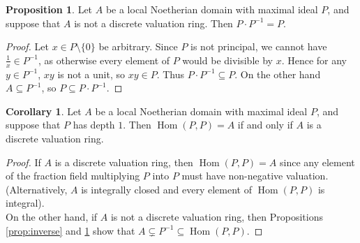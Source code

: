\documentclass{amsart}
\theoremstyle{definition}
\newtheorem{proposition}[theorem]{Proposition}
\newtheorem{corollary}[theorem]{Corollary}
\DeclareMathOperator{\Hom}{Hom}
\begin{document}
\begin{proposition}\label{prop:ptimespinverse}
Let $A$ be a local Noetherian domain with maximal ideal $P$, and suppose that $A$ is not a discrete valuation ring.  Then $P\cdot P^{-1}  = P$.
\end{proposition}
\begin{proof}
Let $x\in P\setminus\{0\}$ be arbitrary.  Since $P$ is not principal, we cannot have $\frac{1}{x} \in P^{-1}$, as otherwise every element of $P$ would be divisible by $x$.  Hence for any $y\in P^{-1}$, $xy$ is not a unit, so $xy\in P$.  Thus $P\cdot P^{-1} \subseteq P$.  On the other hand $A\subseteq P^{-1}$, so $P \subseteq P\cdot P^{-1}$. 
\end{proof}

\begin{corollary}\label{cor:dvr}
Let $A$ be a local Noetherian domain with maximal ideal $P$, and suppose that $P$ has depth $1$.  Then $\Hom(P,P) = A$ if and only if $A$ is a discrete valuation ring.
\end{corollary}
\begin{proof}
If $A$ is a discrete valuation ring, then $\Hom(P,P) = A$ since any element of the fraction field multiplying $P$ into $P$ must have non-negative valuation.  (Alternatively, $A$ is integrally closed and every element of $\Hom(P,P)$ is integral).\\

On the other hand, if $A$ is not a discrete valuation ring, then Propositions \ref{prop:inverse} and \ref{prop:ptimespinverse} show that $A \subsetneq P^{-1} \subseteq \Hom(P,P)$.
\end{proof}
\end{document}
